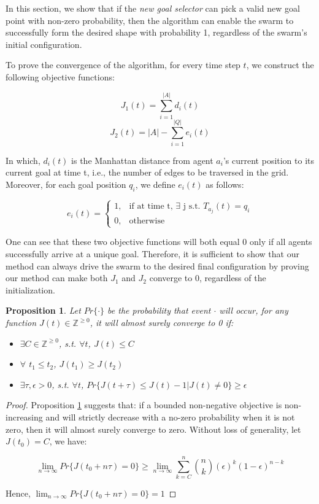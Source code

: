 \documentclass[journal]{IEEEtran}
\newtheorem{proposition}{Proposition}[subsection]
\begin{document}
In this section, we show that if the \textit{new goal selector} can pick a valid new goal point with non-zero probability, then the algorithm can enable the swarm to successfully form the desired shape with probability 1, regardless of the swarm's initial configuration. 

To prove the convergence of the algorithm, for every time step $t$, we construct the following objective functions:

$$J_1(t) = \sum_{i = 1}^{|A|}d_i(t)$$
$$J_2(t) = |A| - \sum_{i = 1}^{|Q|}e_{i}(t) $$

In which, $d_i(t)$ is the Manhattan distance from agent $a_i$'s current position to its current goal at time t, i.e., the number of edges to be traversed in the grid. Moreover, for each goal position $q_i$, we define $e_{i}(t)$ as follows:


    $$e_{i}(t)=
    \begin{cases}
      1, & \text{if at time t, $\exists$ j s.t. $T_{a_j}(t) = q_i$} \\
      0, & \text{otherwise}
    \end{cases}$$
 
  
One can see that these two objective functions will both equal 0 only if all agents successfully arrive at a unique goal.  Therefore, it is sufficient to show that our method can always drive the swarm to the desired final configuration by proving our method can make both $J_1$ and $J_2$ converge to 0, regardless of the initialization.
\begin{proposition}
Let $Pr\{\cdot\}$ be the probability that event $\cdot$ will occur, for any function $J(t)\in \mathbb{Z}^{\geq0}$, it will almost surely converge to 0 if:

\begin{itemize}
  \item $\exists C \in \mathbb{Z}^{\geq0}$, s.t. $\forall t$, $J(t)\leq C$ 
  \item $\forall$ $t_1 \leq t_2$, $J(t_1)\geq J(t_2)$
  \item $\exists \tau, \epsilon>0$, s.t. 
  $\forall t$, $Pr\{J(t + \tau) \leq J(t) - 1| J(t) \neq 0\} \geq \epsilon$
\end{itemize}


\label{root}
\end{proposition} 

\begin{proof}
Proposition \ref{root} suggests that: if a bounded non-negative objective is non-increasing and will strictly decrease with a no-zero probability when it is not zero, then it will almost surely converge to zero. Without loss of generality, let $J(t_0) = C$, we have:

$$\displaystyle \lim_{n \to \infty} Pr\{J(t_0 + n\tau) = 0\}\geq \displaystyle \lim_{n\to\infty} \sum_{k = C}^{n}{{n \choose k}}{(\epsilon)^k}{(1 - \epsilon)}^{n - k}$$

Hence, $\displaystyle \lim_{n\to\infty} Pr\{J(t_0 + n\tau) = 0\} = 1$
\end{proof}
\end{document}
